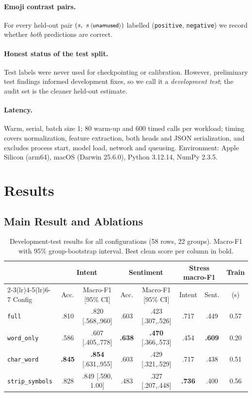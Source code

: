 \documentclass[11pt,a4paper]{article}
\theoremstyle{remark}
\newcommand{\lbl}[1]{\texttt{#1}}                      %
\newcommand{\emo}[1]{\textsf{\small$\langle$#1$\rangle$}} %
\begin{document}
\paragraph{Emoji contrast pairs.} For every held-out pair
$(s,\ s\,\emo{unamused})$ labelled (\lbl{positive}, \lbl{negative}) we record
whether \emph{both} predictions are correct.

\paragraph{Honest status of the test split.} Test labels were never used for
checkpointing or calibration. However, preliminary test findings informed
development fixes, so we call it a \emph{development test}; the audit set is
the cleaner held-out estimate.

\paragraph{Latency.} Warm, serial, batch size 1; 80 warm-up and 600 timed
calls per workload; timing covers normalization, feature extraction, both
heads and JSON serialization, and excludes process start, model load, network
and queueing. Environment: Apple Silicon (arm64), macOS (Darwin 25.6.0),
Python 3.12.14, NumPy 2.3.5.

\section{Results}
\label{sec:results}

\subsection{Main Result and Ablations}

\begin{table}[t]
\centering\small
\caption{Development-test results for all configurations (58 rows, 22 groups).
Macro-F1 with 95\% group-bootstrap interval. Best clean score per column in bold.}
\label{tab:ablation}
\setlength{\tabcolsep}{4.5pt}
\begin{tabular}{@{}l cc cc cc c@{}}
\toprule
& \multicolumn{2}{c}{Intent} & \multicolumn{2}{c}{Sentiment} & \multicolumn{2}{c}{Stress macro-F1} & Train \\
\cmidrule(lr){2-3}\cmidrule(lr){4-5}\cmidrule(lr){6-7}
Config & Acc. & Macro-F1 [95\% CI] & Acc. & Macro-F1 [95\% CI] & Intent & Sent. & (s) \\
\midrule
\lbl{full}          &.810 &.820 [.568,.960] &.603 &.423 [.307,.526] &.717 &.449 & 0.57 \\
\lbl{word\_only}    &.586 &.607 [.405,.778] & \textbf{.638} & \textbf{.470} [.366,.573] &.454 & \textbf{.609} & 0.20 \\
\lbl{char\_word}    & \textbf{.845} & \textbf{.854} [.631,.955] &.603 &.429 [.321,.529] &.717 &.438 & 0.51 \\
\lbl{strip\_symbols}&.828 &.849 [.590, 1.00] &.483 &.327 [.207,.448] & \textbf{.736} &.400 & 0.56 \\
\bottomrule
\end{tabular}
\end{table}
\end{document}
